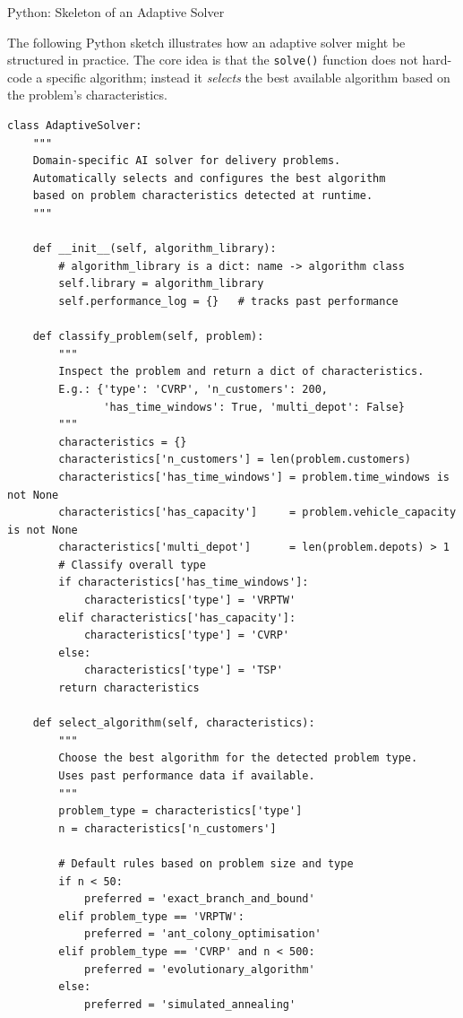 \documentclass[aspectratio=169,10pt]{beamer}
\begin{document}
\begin{frame}[fragile]{Python: Skeleton of an Adaptive Solver}

  The following Python sketch illustrates how an adaptive solver
  might be structured in practice.  The core idea is that the
  \texttt{solve()} function does not hard-code a specific algorithm;
  instead it \emph{selects} the best available algorithm based on
  the problem's characteristics.

  \smallskip
  \begin{lstlisting}
class AdaptiveSolver:
    """
    Domain-specific AI solver for delivery problems.
    Automatically selects and configures the best algorithm
    based on problem characteristics detected at runtime.
    """

    def __init__(self, algorithm_library):
        # algorithm_library is a dict: name -> algorithm class
        self.library = algorithm_library
        self.performance_log = {}   # tracks past performance

    def classify_problem(self, problem):
        """
        Inspect the problem and return a dict of characteristics.
        E.g.: {'type': 'CVRP', 'n_customers': 200,
               'has_time_windows': True, 'multi_depot': False}
        """
        characteristics = {}
        characteristics['n_customers'] = len(problem.customers)
        characteristics['has_time_windows'] = problem.time_windows is not None
        characteristics['has_capacity']     = problem.vehicle_capacity is not None
        characteristics['multi_depot']      = len(problem.depots) > 1
        # Classify overall type
        if characteristics['has_time_windows']:
            characteristics['type'] = 'VRPTW'
        elif characteristics['has_capacity']:
            characteristics['type'] = 'CVRP'
        else:
            characteristics['type'] = 'TSP'
        return characteristics

    def select_algorithm(self, characteristics):
        """
        Choose the best algorithm for the detected problem type.
        Uses past performance data if available.
        """
        problem_type = characteristics['type']
        n = characteristics['n_customers']

        # Default rules based on problem size and type
        if n < 50:
            preferred = 'exact_branch_and_bound'
        elif problem_type == 'VRPTW':
            preferred = 'ant_colony_optimisation'
        elif problem_type == 'CVRP' and n < 500:
            preferred = 'evolutionary_algorithm'
        else:
            preferred = 'simulated_annealing'


\end{lstlisting}
\end{frame}
\end{document}
